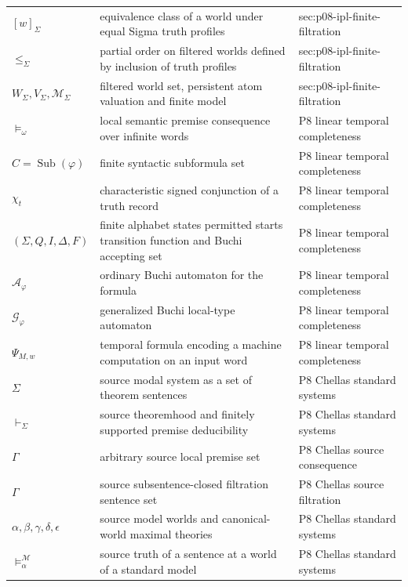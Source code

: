 \begin{longtable}{@{}p{}p{}p{}@{}}
\([w]_\Sigma\) & equivalence class of a world under equal Sigma truth profiles & sec:\allowbreak{}p08-\allowbreak{}ipl-\allowbreak{}finite-\allowbreak{}filtration \\
\(\leq_\Sigma\) & partial order on filtered worlds defined by inclusion of truth profiles & sec:\allowbreak{}p08-\allowbreak{}ipl-\allowbreak{}finite-\allowbreak{}filtration \\
\(W_\Sigma,\allowbreak V_\Sigma,\allowbreak \mathcal M_\Sigma\) & filtered world set, persistent atom valuation and finite model & sec:\allowbreak{}p08-\allowbreak{}ipl-\allowbreak{}finite-\allowbreak{}filtration \\
\(\models_\omega\) & local semantic premise consequence over infinite words & P8 linear temporal completeness \\
\(C=\operatorname{Sub}(\varphi)\) & finite syntactic subformula set & P8 linear temporal completeness \\
\(\chi_t\) & characteristic signed conjunction of a truth record & P8 linear temporal completeness \\
\((\Sigma,\allowbreak Q,\allowbreak I,\allowbreak \Delta,\allowbreak F)\) & finite alphabet states permitted starts transition function and Buchi accepting set & P8 linear temporal completeness \\
\(\mathcal A_\varphi\) & ordinary Buchi automaton for the formula & P8 linear temporal completeness \\
\(\mathcal G_\varphi\) & generalized Buchi local-type automaton & P8 linear temporal completeness \\
\(\Psi_{M,w}\) & temporal formula encoding a machine computation on an input word & P8 linear temporal completeness \\
\(\Sigma\) & source modal system as a set of theorem sentences & P8 Chellas standard systems \\
\(\vdash_\Sigma\) & source theoremhood and finitely supported premise deducibility & P8 Chellas standard systems \\
\(\Gamma\) & arbitrary source local premise set & P8 Chellas source consequence \\
\(\Gamma\) & source subsentence-closed filtration sentence set & P8 Chellas source filtration \\
\(\alpha,\allowbreak \beta,\allowbreak \gamma,\allowbreak \delta,\allowbreak \epsilon\) & source model worlds and canonical-world maximal theories & P8 Chellas standard systems \\
\(\models_\alpha^{\mathcal M}\) & source truth of a sentence at a world of a standard model & P8 Chellas standard systems \\

\end{longtable}
